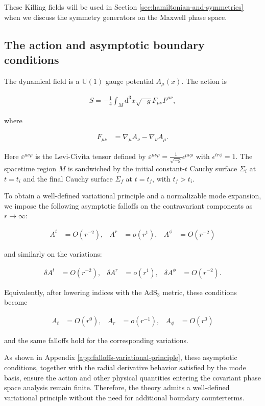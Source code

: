 These Killing fields will be used in Section \ref{sec:hamiltonian-and-symmetries} when we discuss the symmetry generators on the Maxwell phase space.

\subsection{The action and asymptotic boundary conditions}\label{subsec:action-eom}

The dynamical field is a $\mathrm{U}(1)$ gauge potential $A_\mu(x)$. The action is

\begin{align}
S = -\frac{1}{4}\int_M \mathrm{d}^3x \sqrt{-g} F_{\mu\nu} F^{\mu\nu},
\end{align}

where

\begin{align}
F_{\mu\nu}&=\nabla_\mu A_\nu-\nabla_\nu A_\mu.
\end{align}

Here $\varepsilon^{\mu\nu\rho}$ is the Levi-Civita tensor defined by $\varepsilon^{\mu\nu\rho} = \frac{1}{\sqrt{-g}} \epsilon^{\mu\nu\rho}$ with $\epsilon^{tr\phi} = 1$. The spacetime region $M$ is sandwiched by the initial constant-$t$ Cauchy surface $\Sigma_i$ at $t=t_i$ and the final Cauchy surface $\Sigma_f$ at $t=t_f$, with $t_f > t_i$.

To obtain a well-defined variational principle and a normalizable mode expansion, we impose the following asymptotic falloffs on the contravariant components as $r \to \infty$:

\begin{align}
A^{t} & =O(r^{-2}), & A^{r} & =o(r^{1}), & A^{\phi} & =O(r^{-2})
\end{align}

and similarly on the variations:

\begin{align}
\delta A^{t} & =O(r^{-2}), & \delta A^{r} & =o(r^{1}), & \delta A^{\phi} & =O(r^{-2}).
\end{align}

Equivalently, after lowering indices with the AdS$_3$ metric, these conditions become

\begin{align}
A_{t} & =O(r^{0}), & A_{r} & =o(r^{-1}), & A_{\phi} & =O(r^{0})
\end{align}

and the same falloffs hold for the corresponding variations.

As shown in Appendix \ref{app:falloffs-variational-principle}, these asymptotic conditions, together with the radial derivative behavior satisfied by the mode basis, ensure the action and other physical quantities entering the covariant phase space analysis remain finite. Therefore, the theory admits a well-defined variational principle without the need for additional boundary counterterms.
